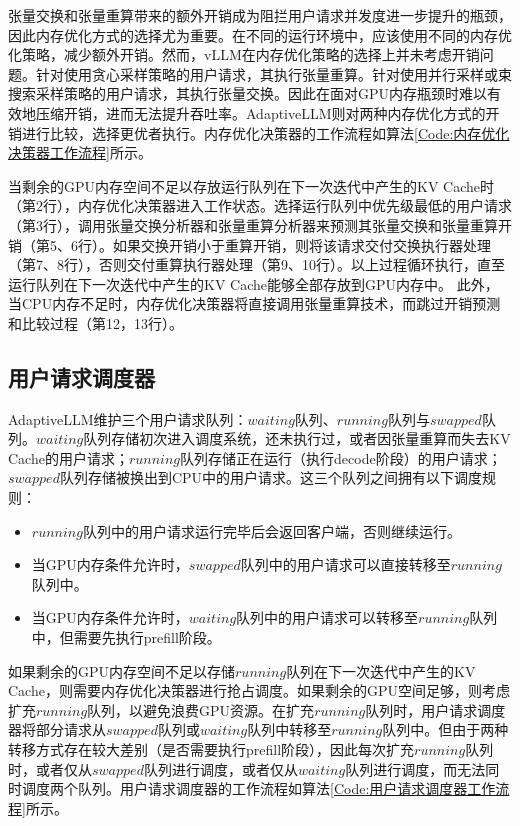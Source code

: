 张量交换和张量重算带来的额外开销成为阻拦用户请求并发度进一步提升的瓶颈，因此内存优化方式的选择尤为重要。在不同的运行环境中，应该使用不同的内存优化策略，减少额外开销。然而，vLLM在内存优化策略的选择上并未考虑开销问题。针对使用贪心采样策略的用户请求，其执行张量重算。针对使用并行采样或束搜索采样策略的用户请求，其执行张量交换。因此在面对GPU内存瓶颈时难以有效地压缩开销，进而无法提升吞吐率。AdaptiveLLM则对两种内存优化方式的开销进行比较，选择更优者执行。内存优化决策器的工作流程如算法\ref{Code:内存优化决策器工作流程}所示。

当剩余的GPU内存空间不足以存放运行队列在下一次迭代中产生的KV Cache时（第2行），内存优化决策器进入工作状态。选择运行队列中优先级最低的用户请求（第3行），调用张量交换分析器和张量重算分析器来预测其张量交换和张量重算开销（第5、6行）。如果交换开销小于重算开销，则将该请求交付交换执行器处理（第7、8行），否则交付重算执行器处理（第9、10行）。以上过程循环执行，直至运行队列在下一次迭代中产生的KV Cache能够全部存放到GPU内存中。 此外，当CPU内存不足时，内存优化决策器将直接调用张量重算技术，而跳过开销预测和比较过程（第12，13行）。


\subsection{用户请求调度器}

AdaptiveLLM维护三个用户请求队列：$waiting$队列、$running$队列与$swapped$队列。$waiting$队列存储初次进入调度系统，还未执行过，或者因张量重算而失去KV Cache的用户请求；$running$队列存储正在运行（执行decode阶段）的用户请求；$swapped$队列存储被换出到CPU中的用户请求。这三个队列之间拥有以下调度规则：

\begin{itemize}
  \item $running$队列中的用户请求运行完毕后会返回客户端，否则继续运行。
  \item 当GPU内存条件允许时，$swapped$队列中的用户请求可以直接转移至$running$队列中。
  \item 当GPU内存条件允许时，$waiting$队列中的用户请求可以转移至$running$队列中，但需要先执行prefill阶段。
\end{itemize}

如果剩余的GPU内存空间不足以存储$running$队列在下一次迭代中产生的KV Cache，则需要内存优化决策器进行抢占调度。如果剩余的GPU空间足够，则考虑扩充$running$队列，以避免浪费GPU资源。在扩充$running$队列时，用户请求调度器将部分请求从$swapped$队列或$waiting$队列中转移至$running$队列中。但由于两种转移方式存在较大差别（是否需要执行prefill阶段），因此每次扩充$running$队列时，或者仅从$swapped$队列进行调度，或者仅从$waiting$队列进行调度，而无法同时调度两个队列。用户请求调度器的工作流程如算法\ref{Code:用户请求调度器工作流程}所示。

